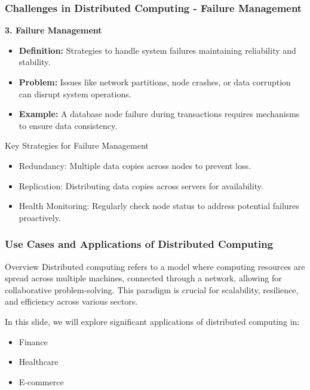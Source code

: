 \documentclass[aspectratio=169]{beamer}
\begin{document}
\begin{frame}[fragile]
    \frametitle{Challenges in Distributed Computing - Failure Management}

    \textbf{3. Failure Management}

    \begin{itemize}
        \item \textbf{Definition:} Strategies to handle system failures maintaining reliability and stability.
        
        \item \textbf{Problem:} Issues like network partitions, node crashes, or data corruption can disrupt system operations.
        
        \item \textbf{Example:} A database node failure during transactions requires mechanisms to ensure data consistency.
    \end{itemize}

    \begin{block}{Key Strategies for Failure Management}
        \begin{itemize}
            \item Redundancy: Multiple data copies across nodes to prevent loss.
            \item Replication: Distributing data copies across servers for availability.
            \item Health Monitoring: Regularly check node status to address potential failures proactively.
        \end{itemize}
    \end{block}
\end{frame}

\begin{frame}[fragile]
    \frametitle{Use Cases and Applications of Distributed Computing}
    \begin{block}{Overview}
        Distributed computing refers to a model where computing resources are spread across multiple machines, connected through a network, 
        allowing for collaborative problem-solving. This paradigm is crucial for scalability, resilience, and efficiency across various sectors.
    \end{block}
    In this slide, we will explore significant applications of distributed computing in:
    \begin{itemize}
        \item Finance
        \item Healthcare
        \item E-commerce
    \end{itemize}
\end{frame}
\end{document}
